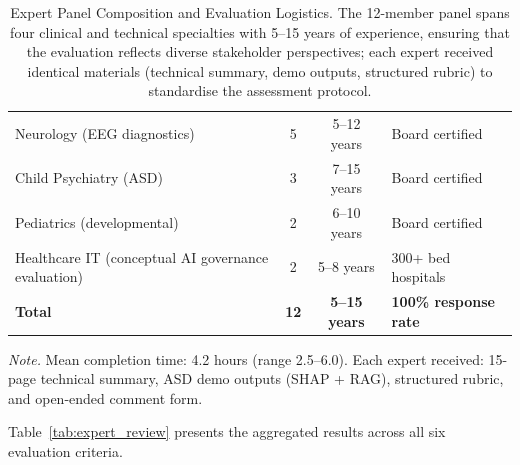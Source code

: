 \begin{table}[!htbp]
\centering
\tablestripes\tablefontsize
\tablefontsize
\caption[Expert Panel Composition and Evaluation Logistics]{Expert Panel Composition and Evaluation Logistics. The 12-member panel spans four clinical and technical specialties with 5--15 years of experience, ensuring that the evaluation reflects diverse stakeholder perspectives; each expert received identical materials (technical summary, demo outputs, structured rubric) to standardise the assessment protocol.}
\begin{tabularx}{\textwidth}{@{} L c c L @{}}
\toprule
{} &  &  &  \\
\midrule
Neurology (EEG diagnostics) & 5 & 5--12 years & Board certified \\
Child Psychiatry (ASD) & 3 & 7--15 years & Board certified \\
Pediatrics (developmental) & 2 & 6--10 years & Board certified \\
Healthcare IT (conceptual AI governance evaluation) & 2 & 5--8 years & 300+ bed hospitals \\
\midrule
\textbf{Total} & \textbf{12} & \textbf{5--15 years} & \textbf{100\% response rate} \\
\bottomrule
\end{tabularx}
\vspace{0.3em}\noindent\textit{Note.} Mean completion time: 4.2 hours (range 2.5--6.0). Each expert received: 15-page technical summary, ASD demo outputs (SHAP + RAG), structured rubric, and open-ended comment form.
\end{table}

Table~\ref{tab:expert_review} presents the aggregated results across all six evaluation criteria.

